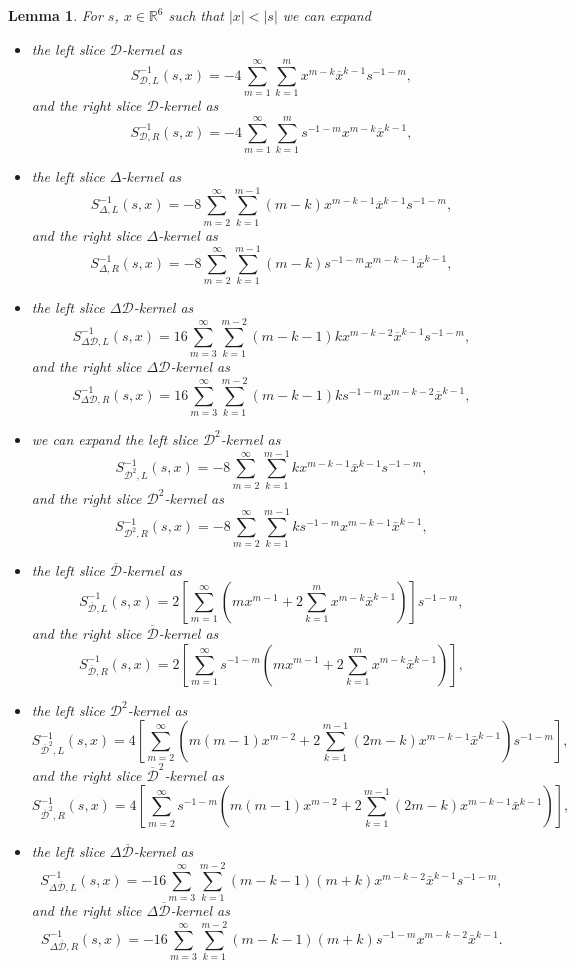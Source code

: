 \documentclass[reqno,11pt]{amsart}
\numberwithin{equation}{section}
\newtheorem{lemma}[theorem]{Lemma}
\theoremstyle{definition}
\begin{document}
\begin{lemma}
\label{lk}
For $s$, $x\in\mathbb R^6$ such that $|x|<|s|$ we can expand
\begin{itemize}
\item the left slice $ \mathcal{D}$-kernel as
$$ S^{-1}_{\mathcal{D},L}(s,x)= -4\sum_{m=1}^{\infty}\sum_{k=1}^m x^{m-k}\overline x^{k-1} s^{-1-m},$$
and the right slice $ \mathcal{D}$-kernel as
$$ S^{-1}_{\mathcal{D},R}(s,x)= -4\sum_{m=1}^{\infty}\sum_{k=1}^m s^{-1-m}x^{m-k}\overline x^{k-1},$$
\item the left slice $ \Delta$-kernel as
$$S^{-1}_{\Delta,L}(s,x)=-8\sum_{m=2}^\infty\sum_{k=1}^{m-1} (m-k)x^{m-k-1}\overline x^{k-1}s^{-1-m},$$
and the right slice $ \Delta$-kernel as
$$S^{-1}_{\Delta,R}(s,x)=-8\sum_{m=2}^\infty\sum_{k=1}^{m-1} (m-k)s^{-1-m}x^{m-k-1}\overline x^{k-1},$$
\item the left slice $ \Delta \mathcal{D}$-kernel as
$$S^{-1}_{\Delta \mathcal{D},L}(s,x)=16\sum_{m=3}^{\infty}\sum_{k=1}^{m-2}(m-k-1)k x^{m-k-2}\overline x^{k-1}s^{-1-m},$$
and the right slice $ \Delta \mathcal{D}$-kernel as
$$S^{-1}_{\Delta \mathcal{D},R}(s,x)=16 \sum_{m=3}^{\infty}\sum_{k=1}^{m-2}(m-k-1)k s^{-1-m}x^{m-k-2}\overline x^{k-1},$$
\item we can expand the left slice $ \mathcal{D}^2$-kernel as
$$S^{-1}_{\mathcal{D}^2,L}(s,x)=-8 \sum_{m=2}^\infty \sum_{k=1}^{m-1} k x^{m-k-1} \bar{x}^{k-1}s^{-1-m},$$
and the right slice $ \mathcal{D}^2$-kernel as
$$S^{-1}_{\mathcal{D}^2,R}(s,x)=-8 \sum_{m=2}^\infty \sum_{k=1}^{m-1} k s^{-1-m} x^{m-k-1} \bar{x}^{k-1},$$
\item the left slice $ \mathcal{\overline{D}}$-kernel as
$$S^{-1}_{\mathcal{\overline{D}},L}(s,x)=2  \left[\sum_{m=1}^\infty \left(mx^{m-1}  +2  \sum_{k=1}^{m} x^{m-k} \bar{x}^{k-1} \right) \right] s^{-1-m},$$
and the right slice $ \mathcal{\overline{D}}$-kernel as
$$S^{-1}_{\mathcal{\overline{D}},R}(s,x)=2  \left[\sum_{m=1}^\infty s^{-1-m} \left(mx^{m-1}  +2  \sum_{k=1}^{m} x^{m-k} \bar{x}^{k-1} \right) \right] ,$$
\item the left slice $ \mathcal{D}^2$-kernel as
$$S^{-1}_{\mathcal{\overline{D}}^2,L}(s,x)=4 \left[\sum_{m=2}^\infty \left(m(m-1)x^{m-2}+2  \sum_{k=1}^{m-1} (2m-k)x^{m-k-1}\bar{x}^{k-1}\right) s^{-1-m} \right],$$
and the right slice $ \mathcal{\overline{D}}^2$-kernel as
$$S^{-1}_{\mathcal{\overline{D}}^2,R}(s,x)=4 \left[\sum_{m=2}^\infty s^{-1-m} \left(m(m-1)x^{m-2}+2  \sum_{k=1}^{m-1} (2m-k)x^{m-k-1}\bar{x}^{k-1}\right)  \right],$$
\item the left slice $ \Delta \mathcal{\overline{D}}$-kernel as
$$S^{-1}_{\Delta \mathcal{\overline{D}},L}(s,x)=-16 \sum_{m=3}^\infty \sum_{k=1}^{m-2} (m-k-1)(m+k)x^{m-k-2} \bar{x}^{k-1}s^{-1-m},$$
and the right slice $ \Delta \mathcal{\overline{D}}$-kernel as
$$S^{-1}_{\Delta \mathcal{\overline{D}},R}(s,x)= -16 \sum_{m=3}^\infty \sum_{k=1}^{m-2} (m-k-1)(m+k)s^{-1-m}x^{m-k-2} \bar{x}^{k-1}.$$
\end{itemize}
\end{lemma}
\end{document}
